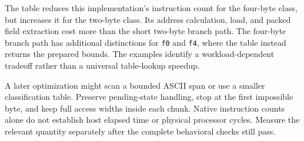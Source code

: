 The table reduces this implementation's instruction count for the four-byte class,
but increases it for the two-byte class. Its address calculation, load, and packed
field extraction cost more than the short two-byte branch path. The four-byte
branch path has additional distinctions for \texttt{f0} and \texttt{f4}, where the
table instead returns the prepared bounds. The examples identify a workload-dependent
tradeoff rather than a universal table-lookup speedup.

A later optimization might scan a bounded ASCII span or use a smaller classification
table. Preserve pending-state handling, stop at the first impossible byte, and keep
full access widths inside each chunk. Native instruction counts alone do not
establish host elapsed time or physical processor cycles. Measure the relevant
quantity separately after the complete behavioral checks still pass.
